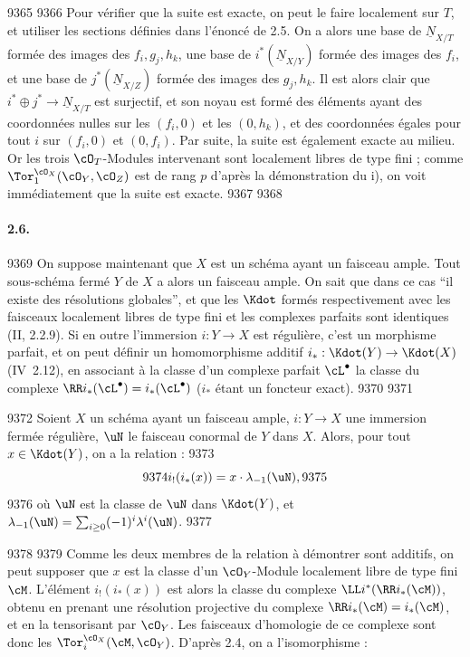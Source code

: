   9365	
  9366	Pour v\'erifier que la suite est exacte, on peut le faire localement sur $T$, et utiliser les sections d\'efinies dans l'\'enonc\'e de 2.5. On a alors une base de $\underline{N}_{X/T}$ form\'ee des images des $f_i, g_j, h_k$, une base de $i^{*}(\underline{N}_{X/Y})$ form\'ee des images des $f_i$, et une base de $j^{*}(\underline{N}_{X/Z})$ form\'ee des images des $g_j, h_k$. Il est alors clair que $i^{*} \oplus j^{*} \to \underline{N}_{X/T}$ est surjectif, et son noyau est form\'e des \'el\'ements ayant des coordonn\'ees nulles sur les $(f_i, 0)$ et les $(0, h_k)$, et des coordonn\'ees \'egales pour tout $i$ sur $(f_i, 0)$ et $(0, f_i)$. Par suite, la suite est \'egalement exacte au milieu. Or les trois $\cO_T$-Modules intervenant sont localement libres de type fini ; comme $\Tor_1^{\cO_X}(\cO_Y, \cO_Z)$ est de rang $p$ d'apr\`es la d\'emonstration du i), on voit imm\'ediatement que la suite est exacte.
  9367	
  9368	\paragraph{2.6.}
  9369	On suppose maintenant que $X$ est un sch\'ema ayant un faisceau ample. Tout sous-sch\'ema ferm\'e $Y$ de $X$ a alors un faisceau ample. On sait que dans ce cas ``il existe des r\'esolutions globales'', et que les $\Kdot$ form\'es respectivement avec les faisceaux localement libres de type fini et les complexes parfaits sont identiques (II, 2.2.9). Si en outre l'immersion $i: Y \to X$ est r\'eguli\`ere, c'est un morphisme parfait, et on peut d\'efinir un homomorphisme additif $i_{*}: \Kdot(Y) \to \Kdot(X)$ (IV~2.12), en associant \`a la classe d'un complexe parfait $\cL^{\bullet}$ la classe du complexe $\RR i_{*}(\cL^{\bullet}) = i_{*}(\cL^{\bullet})$ ($i_{*}$ \'etant un foncteur exact).
  9370	
  9371	\begin{proposition}[2.7]
  9372	Soient $X$ un sch\'ema ayant un faisceau ample, $i: Y \to X$ une immersion ferm\'ee r\'eguli\`ere, $\uN$ le faisceau conormal de $Y$ dans $X$. Alors, pour tout $x \in \Kdot(Y)$, on a la relation :
  9373	\[
  9374	i_{!}(i_{*}(x)) = x \cdot \lambda_{-1}(\uN),
  9375	\]
  9376	o\`u $\uN$ est la classe de $\uN$ dans $\Kdot(Y)$, et $\lambda_{-1}(\uN) = \sum_{i \geq 0} (-1)^i \lambda^i(\uN)$.
  9377	\end{proposition}
  9378	
  9379	Comme les deux membres de la relation \`a d\'emontrer sont additifs, on peut supposer que $x$ est la classe d'un $\cO_Y$-Module localement libre de type fini $\cM$. L'\'el\'ement $i_{!}(i_{*}(x))$ est alors la classe du complexe $\LL i^{*}(\RR i_{*}(\cM))$, obtenu en prenant une r\'esolution projective du complexe $\RR i_{*}(\cM) = i_{*}(\cM)$, et en la tensorisant par $\cO_Y$. Les faisceaux d'homologie de ce complexe sont donc les $\Tor_i^{\cO_X}(\cM, \cO_Y)$. D'apr\`es 2.4, on a l'isomorphisme :
